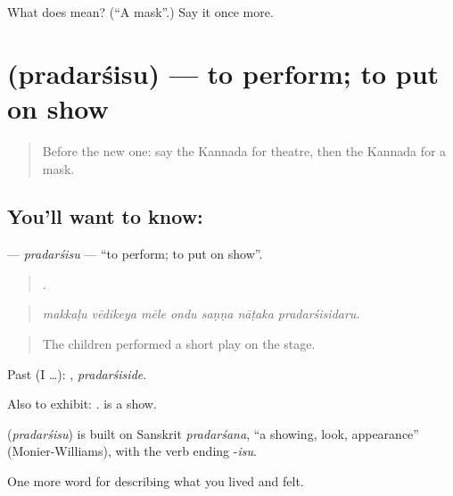 \begin{tcolorbox}[breakable,colback=teal!4,colframe=teal!35!black,title={Before you move on}]
What does  mean? (\textquotedblleft{}A mask\textquotedblright{}.) Say it once more.
\end{tcolorbox}
\section[\texorpdfstring{\kn{ಪ್ರದರ್ಶಿಸು} (pradarśisu)}{ಪ್ರದರ್ಶಿಸು (pradarśisu)}]{ (pradarśisu) — to perform; to put on show}

\label{lesson:KA-C536-pradarsisu}



\begin{quote}
Before the new one: say the Kannada for theatre, then the Kannada for a mask.
\end{quote}

\subsection*{You'll want to know: }
\textbf{} — \emph{pradarśisu} — \textquotedblleft{}to perform; to put on show\textquotedblright{}.

\begin{quote}
      .
\end{quote}

\begin{quote}
\emph{makkaḷu vēdikeya mēle ondu saṇṇa nāṭaka pradarśisidaru.}
\end{quote}

\begin{quote}
The children performed a short play on the stage.
\end{quote}

Past (I …): , \emph{pradarśiside}.

Also to exhibit:  .  is a show.

\begin{cousinweb}
\textbf{} (\emph{pradarśisu}) is built on Sanskrit \emph{pradarśana}, \textquotedblleft{}a showing, look, appearance\textquotedblright{} (Monier-Williams), with the verb ending -\emph{isu}.
\end{cousinweb}

\begin{grammarlens}[title={What you've built}]
One more word for describing what you lived and felt.
\end{grammarlens}


